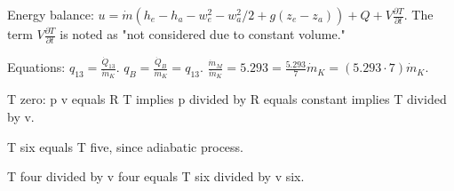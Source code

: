 Energy balance:  
\( u = \dot{m} (h_e - h_a - w_e^2 - w_a^2 / 2 + g (z_e - z_a)) + Q + V \frac{\partial T}{\partial t} \).  
The term \( V \frac{\partial T}{\partial t} \) is noted as "not considered due to constant volume."  

Equations:  
\( q_{13} = \frac{\dot{Q}_{13}}{\dot{m}_K} \).  
\( q_B = \frac{\dot{Q}_B}{\dot{m}_K} = q_{13} \).  
\( \frac{\dot{m}_M}{\dot{m}_K} = 5.293 = \frac{5.293}{7} \dot{m}_K = (5.293 \cdot 7) \dot{m}_K \).

T zero: p v equals R T implies p divided by R equals constant implies T divided by v.  

T six equals T five, since adiabatic process.  

T four divided by v four equals T six divided by v six.